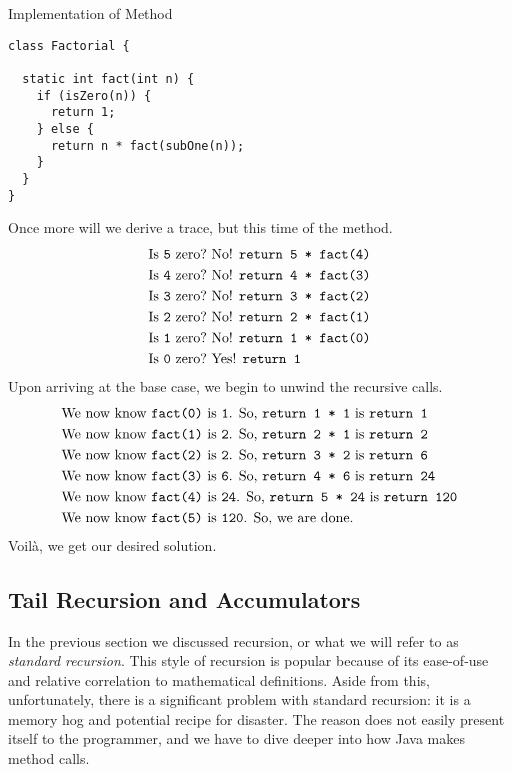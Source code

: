 \begin{cl}[]{Implementation of  Method}
\begin{lstlisting}[language=MyJava]
class Factorial {

  static int fact(int n) {
    if (isZero(n)) {
      return 1;
    } else {
      return n * fact(subOne(n));
    }
  }
}
\end{lstlisting}
\end{cl}
Once more will we derive a trace, but this time of the  method.
\begin{align*}
    \text{Is }\texttt{5} \text{ zero?} &\text{ No! }\texttt{return 5 * fact(4)}\\
    \text{Is }\texttt{4} \text{ zero?} &\text{ No! }\texttt{return 4 * fact(3)}\\
    \text{Is }\texttt{3} \text{ zero?} &\text{ No! }\texttt{return 3 * fact(2)}\\
    \text{Is }\texttt{2} \text{ zero?} &\text{ No! }\texttt{return 2 * fact(1)}\\
    \text{Is }\texttt{1} \text{ zero?} &\text{ No! }\texttt{return 1 * fact(0)}\\
    \text{Is }\texttt{0} \text{ zero?} &\text{ Yes! }\texttt{return 1}
\end{align*}
Upon arriving at the base case, we begin to unwind the recursive calls.
\begin{align*}
    &\text{We now know }\texttt{fact(0)} \text{ is }\texttt{1}\text{. So, } \texttt{return 1 * 1} \text{ is } \texttt{return 1}\\
    &\text{We now know }\texttt{fact(1)} \text{ is }\texttt{2}\text{. So, } \texttt{return 2 * 1} \text{ is } \texttt{return 2}\\
    &\text{We now know }\texttt{fact(2)} \text{ is }\texttt{2}\text{. So, } \texttt{return 3 * 2} \text{ is } \texttt{return 6}\\
    &\text{We now know }\texttt{fact(3)} \text{ is }\texttt{6}\text{. So, } \texttt{return 4 * 6} \text{ is } \texttt{return 24}\\
    &\text{We now know }\texttt{fact(4)} \text{ is }\texttt{24}\text{. So, } \texttt{return 5 * 24} \text{ is } \texttt{return 120}\\
    &\text{We now know }\texttt{fact(5)} \text{ is }\texttt{120}\text{. So, } \text{we are done.} 
\end{align*}
Voil\`a, we get our desired solution.

\subsection*{Tail Recursion and Accumulators}
In the previous section we discussed recursion, or what we will refer to as \textit{standard recursion}. This style of recursion is popular because of its ease-of-use and relative correlation to mathematical definitions. Aside from this, unfortunately, there is a significant problem with standard recursion: it is a memory hog and potential recipe for disaster. The reason does not easily present itself to the programmer, and we have to dive deeper into how Java makes method calls.

